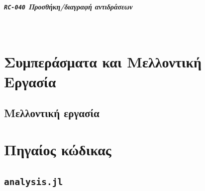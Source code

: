 \documentclass[a4paper,nobib]{tufte-book}
\begin{document}

\paragraph{\textbf{\texttt{RC-040} Προσθήκη/διαγραφή αντιδράσεων}}~


\chapter{Συμπεράσματα και Μελλοντική Εργασία}


\label{cap:conclusion}


\section{Μελλοντική εργασία}


\appendix

\begin{fullwidth}
\bgroup
\printbibliography[heading=bibnumbered,title={Βιβλιογραφία}]
\egroup
\end{fullwidth}


\printindex

\chapter{Πηγαίος κώδικας}
\label{sec:source_code}



\section*{\texttt{analysis.jl}}
\label{app:analysisjl}

\begin{fullwidth}
\end{fullwidth}

\inputminted{julia}{analysis/comparisons_el.jl}
\end{document}
